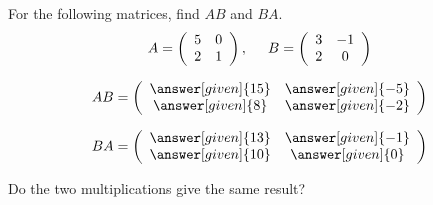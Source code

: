 \documentclass{ximera}
\begin{document}
\begin{question}
For the following matrices, find $AB$ and $BA$.
\[
A= \left(\begin{array}{cc}
5 & 0 \\
2 & 1
\end{array}\right), \hspace{.5cm} B = \left(\begin{array}{cc}
3 & -1 \\
2 & 0
\end{array}\right)
\]
\begin{prompt}
\[
AB = \left(\begin{array}{cc}
\answer[given]{15} & \answer[given]{-5}\\
\answer[given]{8} & \answer[given]{-2}
\end{array}\right)\]

\[BA = \left(\begin{array}{cc}
\answer[given]{13} & \answer[given]{-1}\\
\answer[given]{10} & \answer[given]{0}
\end{array}\right)\]
\end{prompt}
Do the two multiplications give the same result? 
\end{question}
\end{document}
